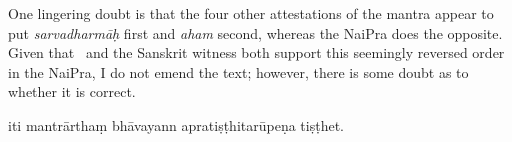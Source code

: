 \documentclass[naipra.tex]{subfiles}
\begin{document}
\begin{sanskrit}
{\begin{english}
		One lingering doubt is that the four other attestations of the mantra appear to put \emph{sarvadharmāḥ} first and \emph{aham} second, whereas the NaiPra does the opposite.
		Given that \TIB\ and the Sanskrit witness both support this seemingly reversed order in the NaiPra, I do not emend the text; however, there is some doubt as to whether it is correct.
	\end{english}
} iti mantrārthaṃ bhāvayann apratiṣṭhitarūpeṇa tiṣṭhet. 
\pend




\end{sanskrit}
\end{document}
